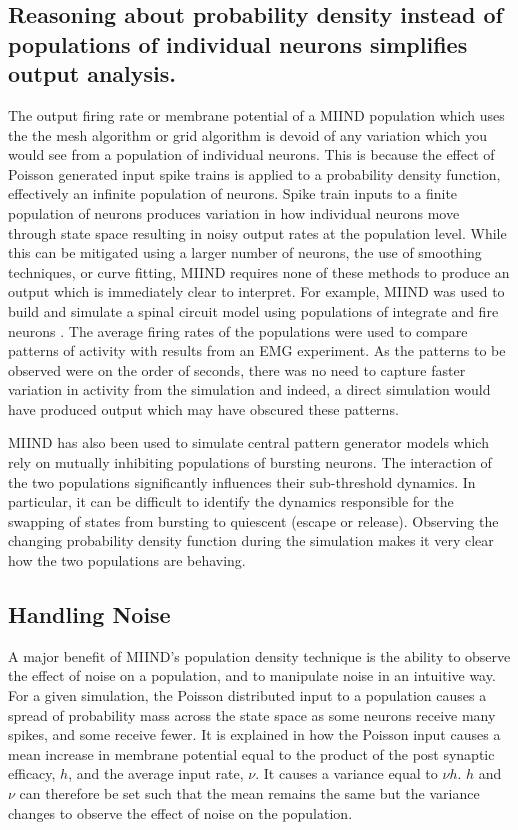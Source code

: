 \documentclass[utf8]{frontiersSCNS} %
\begin{document}
\subsection*{Reasoning about probability density instead of populations of individual neurons simplifies output analysis.}
The output firing rate or membrane potential of a MIIND population which uses the the mesh algorithm or grid algorithm is devoid of any variation which you would see from a population of individual neurons. This is because the effect of Poisson generated input spike trains is applied to a probability density function, effectively an infinite population of neurons. Spike train inputs to a finite population of neurons produces variation in how individual neurons move through state space resulting in noisy output rates at the population level. While this can be mitigated using a larger number of neurons, the use of smoothing techniques, or curve fitting, MIIND requires none of these methods to produce an output which is immediately clear to interpret. For example, MIIND was used to build and simulate a spinal circuit model using populations of integrate and fire neurons \citep{york2019muscles}. The average firing rates of the populations were used to compare patterns of activity with results from an EMG experiment. As the patterns to be observed were on the order of seconds, there was no need to capture faster variation in activity from the simulation and indeed, a direct simulation would have produced output which may have obscured these patterns.

MIIND has also been used to simulate central pattern generator models which rely on mutually inhibiting populations of bursting neurons. The interaction of the two populations significantly influences their sub-threshold dynamics. In particular, it can be difficult to identify the dynamics responsible for the swapping of states from bursting to quiescent (escape or release). Observing the changing probability density function during the simulation makes it very clear how the two populations are behaving.

\subsection*{Handling Noise}
\label{handlingnoise}
A major benefit of MIIND's population density technique is the ability to observe the effect of noise on a population, and to manipulate noise in an intuitive way. For a given simulation, the Poisson distributed input to a population causes a spread of probability mass across the state space as some neurons receive many spikes, and some receive fewer. It is explained in \cite{de2013generic} how the Poisson input causes a mean increase in membrane potential equal to the product of the post synaptic efficacy, $h$, and the average input rate, $\nu$. It causes a variance equal to $\nu h$\texttwosuperior. $h$ and $\nu$ can therefore be set such that the mean remains the same but the variance changes to observe the effect of noise on the population.
\end{document}
